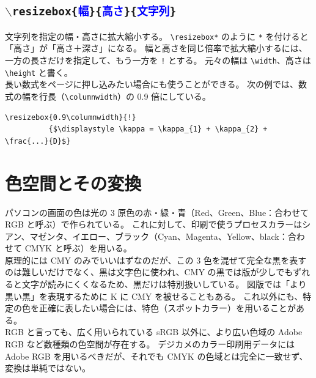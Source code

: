 \subsection{\texttt{$\backslash$resizebox\{\textcolor{blue}{幅}\}\{\textcolor{blue}{高さ}\}\{\textcolor{blue}{文字列}\}}}
文字列を指定の幅・高さに拡大縮小する。
\verb`\resizebox*` のように \verb`*` を付けると「高さ」が「高さ＋深さ」になる。
幅と高さを同じ倍率で拡大縮小するには、一方の長さだけを指定して、もう一方を \verb`!` とする。
元々の幅は \verb`\width`、高さは \verb`\height` と書く。\\

長い数式をページに押し込みたい場合にも使うことができる。
次の例では、数式の幅を行長（\verb`\columnwidth`）の 0.9 倍にしている。
\begin{mdframed}[roundcorner=0.50zw,leftmargin=3.00zw,rightmargin=3.00zw,skipabove=0.40zw,skipbelow=0.40zw,innertopmargin=4.00pt,innerbottommargin=4.00pt,innerleftmargin=5.00pt,innerrightmargin=5.00pt,linecolor=gray!020,linewidth=0.50pt,backgroundcolor=gray!20]
\begin{verbatim}
\resizebox{0.9\columnwidth}{!}
          {$\displaystyle \kappa = \kappa_{1} + \kappa_{2} + \frac{...}{D}$}
\end{verbatim}
\end{mdframed}
\section{色空間とその変換}
パソコンの画面の色は光の 3 原色の赤・緑・青（Red、Green、Blue：合わせて RGB と呼ぶ）で作られている。
これに対して、印刷で使うプロセスカラーはシアン、マゼンタ、イエロー、ブラック（Cyan、Magenta、Yellow、black：合わせて CMYK と呼ぶ）を用いる。\\

原理的には CMY のみでいいはずなのだが、この 3 色を混ぜて完全な黒を表すのは難しいだけでなく、黒は文字色に使われ、CMY の黒では版が少しでもずれると文字が読みにくくなるため、黒だけは特別扱いしている。
図版では「より黒い黒」を表現するために K に CMY を被せることもある。
これ以外にも、特定の色を正確に表したい場合には、特色（スポットカラー）を用いることがある。\\

RGB と言っても、広く用いられている sRGB 以外に、より広い色域の Adobe RGB など数種類の色空間が存在する。
デジカメのカラー印刷用データには Adobe RGB を用いるべきだが、それでも CMYK の色域とは完全に一致せず、変換は単純ではない。\\

